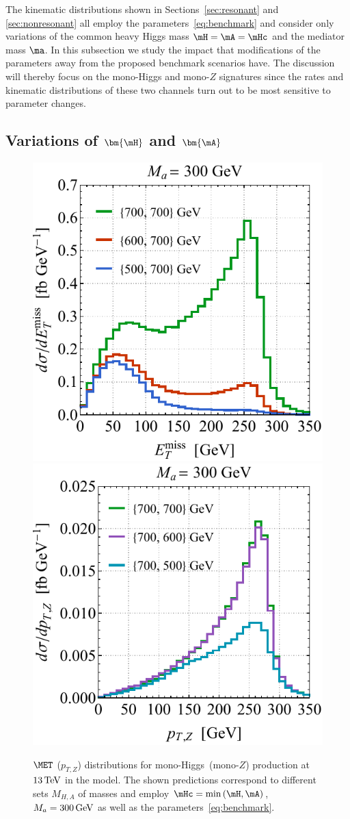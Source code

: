 The  kinematic distributions shown in Sections~\ref{sec:resonant} and \ref{sec:nonresonant}  all employ the parameters~\eqref{eq:benchmark} and consider only variations of the common heavy Higgs mass $\mH = \mA = \mHc$ and the mediator mass $\ma$.  In this subsection we study the impact that modifications of the parameters away from the proposed \hdma benchmark scenarios have. The  discussion will thereby focus on the mono-Higgs and mono-$Z$ signatures since the rates and kinematic distributions of these two channels turn out to be  most sensitive to parameter changes. 

\subsection*{Variations of $\bm{\mH}$ and $\bm{\mA}$}

\begin{figure}[t!]
\centering
\includegraphics[height=0.45\textwidth]{texinputs/04_grid/newfigures/mvarl.pdf} \qquad 
\includegraphics[height=0.45\textwidth]{texinputs/04_grid/newfigures/mvarr.pdf}
\vspace{2mm}
\caption{\label{fig:mvar} $\MET$ ($p_{T,Z}$) distributions for mono-Higgs~(mono-$Z$) production at $13 \, {\rm TeV}$ in the \hdma model.  The shown predictions  correspond to different sets $M_{H,A}$ of masses and employ $\mHc = {\rm min} \left ( \mH, \mA \right )$, $M_a = 300 \, {\rm GeV}$  as well as the parameters~\eqref{eq:benchmark}.}
\end{figure}

